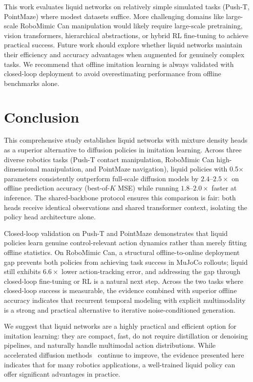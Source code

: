 \documentclass{article}
\begin{document}
This work evaluates liquid networks on relatively simple simulated tasks (Push-T, PointMaze) where modest datasets suffice. More challenging domains like large-scale RoboMimic Can manipulation would likely require large-scale pretraining, vision transformers, hierarchical abstractions, or hybrid RL fine-tuning to achieve practical success. Future work should explore whether liquid networks maintain their efficiency and accuracy advantages when augmented for genuinely complex tasks. We recommend that offline imitation learning is always validated with closed-loop deployment to avoid overestimating performance from offline benchmarks alone.

\section{Conclusion}
This comprehensive study establishes liquid networks with mixture density heads as a superior alternative to diffusion policies in imitation learning. Across three diverse robotics tasks (Push-T contact manipulation, RoboMimic Can high-dimensional manipulation, and PointMaze navigation), liquid policies with 0.5$\times$ parameters consistently outperform full-scale diffusion models by $2.4$--$2.5\times$ on offline prediction accuracy (best-of-$K$ MSE) while running $1.8$--$2.0\times$ faster at inference. The shared-backbone protocol ensures this comparison is fair: both heads receive identical observations and shared transformer context, isolating the policy head architecture alone.

Closed-loop validation on Push-T and PointMaze demonstrates that liquid policies learn genuine control-relevant action dynamics rather than merely fitting offline statistics. On RoboMimic Can, a structural offline-to-online deployment gap prevents both policies from achieving task success in MuJoCo rollouts; liquid still exhibits $6.6\times$ lower action-tracking error, and addressing the gap through closed-loop fine-tuning or RL is a natural next step. Across the two tasks where closed-loop success is measurable, the evidence combined with superior offline accuracy indicates that recurrent temporal modeling with explicit multimodality is a strong and practical alternative to iterative noise-conditioned generation.

We suggest that liquid networks are a highly practical and efficient option for imitation learning: they are compact, fast, do not require distillation or denoising pipelines, and naturally handle multimodal action distributions. While accelerated diffusion methods~\cite{prasad2024consistency,wang2024onedp,hoeg2024sdp,wu2025lightdp} continue to improve, the evidence presented here indicates that for many robotics applications, a well-trained liquid policy can offer significant advantages in practice.
\end{document}
